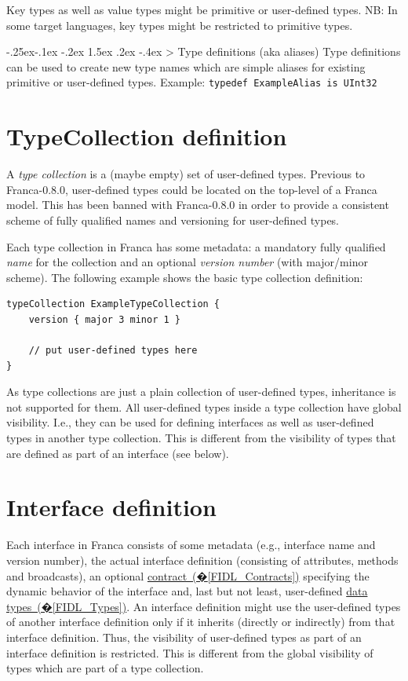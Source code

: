 \documentclass[a4paper,10pt]{scrreprt}
\makeatletter
\renewcommand\subsection{\medskip\@startsection{subsection}{2}{\z@}%
  {-.25ex\@plus -.1ex \@minus -.2ex}%
  {1.5ex \@plus .2ex \@minus -.4ex}%
  {\ifnum \scr@compatibility>\@nameuse{scr@v@2.96}\relax
    \setlength{\parfillskip}{\z@ plus 1fil}\fi
    \raggedsection\normalfont\sectfont\nobreak\size@subsection
  }%
}
\makeatother
\begin{document}
Key types as well as value types might be primitive or user-defined types. 
NB: In some target languages, key types might be restricted to primitive types.

\subsection{Type definitions (aka aliases)}
\label{FIDL_Types_TypeDef}
Type definitions can be used to create new type names which are simple aliases for
existing primitive or user-defined types. Example:
\protect\lstinline[language=Franca]{typedef ExampleAlias is UInt32}

\section{TypeCollection definition}
\label{FIDL_TypeCollection}
A \textit{type collection} is a (maybe empty) set of user-defined types.
Previous to Franca-0.8.0, user-defined types could be located on the
top-level of a Franca model. This has been banned with Franca-0.8.0 in order to 
provide a consistent scheme of fully qualified names and versioning for
user-defined types.

Each type collection in Franca has some metadata: a mandatory fully qualified
\textit{name} for the collection and an optional \textit{version number} (with major/minor scheme).
The following example shows the basic type collection definition:


\begin{lstlisting}[language=Franca]
typeCollection ExampleTypeCollection {
	version { major 3 minor 1 }
	
	// put user-defined types here
}
\end{lstlisting}

As type collections are just a plain collection of user-defined types,
inheritance is not supported for them. All user-defined types inside a
type collection have global visibility. I.e., they can be used for
defining interfaces as well as user-defined types in another type collection.
This is different from the visibility of types that are defined as part of an
interface (see below).  

\section{Interface definition}
\label{FIDL_Interface}
Each interface in Franca consists of some metadata (e.g., interface name and version number),
the actual interface definition (consisting of attributes, methods and broadcasts), an optional
\hyperref[FIDL_Contracts]{contract~(�\ref*{FIDL_Contracts})} specifying the dynamic behavior of the interface and, last but not least,
user-defined \hyperref[FIDL_Types]{data types~(�\ref*{FIDL_Types})}. An interface definition might use the user-defined
types of another interface definition only if it inherits (directly or indirectly)
from that interface definition. Thus, the visibility of user-defined types as part of an
interface definition is restricted. This is different from the global visibility of types
which are part of a type collection.    
\end{document}
